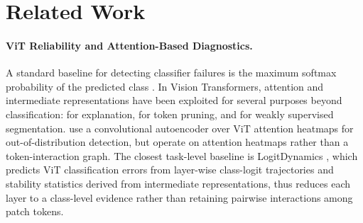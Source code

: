 \documentclass[11pt]{article}
\begin{document}

\section{Related Work}

\paragraph{ViT Reliability and Attention-Based Diagnostics.}
A standard baseline for detecting classifier failures is the maximum softmax probability of the predicted class \citep{Hendrycks2017}. In Vision Transformers, attention and intermediate representations have been exploited for several purposes beyond classification: \citet{Chefer2021} for explanation, \citet{Wang2024} for token pruning, and \citet{Yang2025} for weakly supervised segmentation. \citet{Cultrera2023} use a convolutional autoencoder over ViT attention heatmaps for out-of-distribution detection, but operate on attention heatmaps rather than a token-interaction graph. The closest task-level baseline is LogitDynamics \citep{Beigelman2026}, which predicts ViT classification errors from layer-wise class-logit trajectories and stability statistics derived from intermediate representations, thus reduces each layer to a class-level evidence rather than retaining pairwise interactions among patch tokens.
\end{document}
